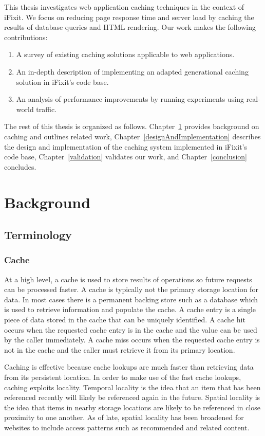 \documentclass[12pt]{ucthesis}
\begin{document}
This thesis investigates web application caching techniques in the context of \textsf{iFixit}.
We focus on reducing page response time and server load by caching the results of database queries and HTML rendering.
Our work makes the following contributions:

\begin{enumerate}
   \item A survey of existing caching solutions applicable to web applications.
   \item An in-depth description of implementing an adapted generational caching solution in \textsf{iFixit}'s code base.
   \item An analysis of performance improvements by running experiments using real-world traffic.
\end{enumerate}

The rest of this thesis is organized as follows.
Chapter~\ref{background} provides background on caching and outlines related work, Chapter~\ref{designAndImplementation} describes the design and implementation of the caching system implemented in \textsf{iFixit}'s code base, Chapter~\ref{validation} validates our work, and Chapter~\ref{conclusion} concludes.


\chapter{Background} \label{background}
\section{Terminology}
\subsection{Cache}
At a high level, a cache is used to store results of operations so future requests can be processed faster.
A cache is typically not the primary storage location for data.
In most cases there is a permanent backing store such as a database which is used to retrieve information and populate the cache.
A cache entry is a single piece of data stored in the cache that can be uniquely identified.
A cache hit occurs when the requested cache entry is in the cache and the value can be used by the caller immediately.
A cache miss occurs when the requested cache entry is not in the cache and the caller must retrieve it from its primary location.

Caching is effective because cache lookups are much faster than retrieving data from its persistent location.
In order to make use of the fast cache lookups, caching exploits locality.
Temporal locality is the idea that an item that has been referenced recently will likely be referenced again in the future.
Spatial locality is the idea that items in nearby storage locations are likely to be referenced in close proximity to one another.
As of late, spatial locality has been broadened for websites to include access patterns such as recommended and related content.
\end{document}
